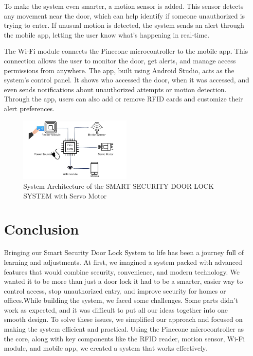 \documentclass[USenglish,oneside,twocolumn]{article}
\begin{document}
To make the system even smarter, a motion sensor is added. This sensor detects any movement near the door, which can help identify if someone unauthorized is trying to enter. If unusual motion is detected, the system sends an alert through the mobile app, letting the user know what’s happening in real-time.

The Wi-Fi module connects the Pinecone microcontroller to the mobile app. This connection allows the user to monitor the door, get alerts, and manage access permissions from anywhere. The app, built using Android Studio, acts as the system’s control panel. It shows who accessed the door, when it was accessed, and even sends notifications about unauthorized attempts or motion detection. Through the app, users can also add or remove RFID cards and customize their alert preferences. 
\begin{figure}[h!]
    \centering
    \includegraphics[width=0.5\textwidth]{architecture.jpeg}
    \caption{System Architecture of the SMART SECURITY DOOR LOCK SYSTEM with Servo Motor}
    \label{fig:system_architecture}
\end{figure}
	
	
	\section{Conclusion}
\label{sec:Conclusion}

Bringing our Smart Security Door Lock System to life has been a journey full of learning and adjustments. At first, we imagined a system packed with advanced features that would combine security, convenience, and modern technology. We wanted it to be more than just a door lock  it had to be a smarter, easier way to control access, stop unauthorized entry, and improve security for homes or offices.While building the system, we faced some challenges. Some parts didn’t work as expected, and it was difficult to put all our ideas together into one smooth design. To solve these issues, we simplified our approach and focused on making the system efficient and practical. Using the Pinecone microcontroller as the core, along with key components like the RFID reader, motion sensor, Wi-Fi module, and mobile app, we created a system that works effectively.
\end{document}
